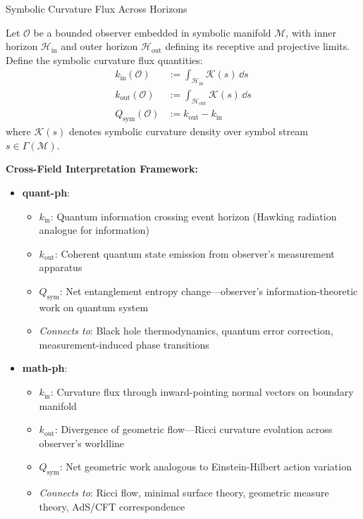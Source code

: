 \begin{scholium}{Symbolic Curvature Flux Across Horizons}
\label{scholium:bk1_curvature_flux_kin_kout}

Let $\mathcal{O}$ be a bounded observer embedded in symbolic manifold $\mathcal{M}$, with inner horizon $\mathcal{H}_{\text{in}}$ and outer horizon $\mathcal{H}_{\text{out}}$ defining its receptive and projective limits. Define the symbolic curvature flux quantities:
\begin{align}
k_{\text{in}}(\mathcal{O}) &:= \int_{\mathcal{H}_{\text{in}}} \mathcal{K}(s) \, \dd s \\
k_{\text{out}}(\mathcal{O}) &:= \int_{\mathcal{H}_{\text{out}}} \mathcal{K}(s) \, \dd s \\
Q_{\text{sym}}(\mathcal{O}) &:= k_{\text{out}} - k_{\text{in}}
\end{align}
where $\mathcal{K}(s)$ denotes symbolic curvature density over symbol stream $s \in \Gamma(\mathcal{M})$.

\textbf{Cross-Field Interpretation Framework:}

\begin{itemize}
\item \textbf{quant-ph}: 
  \begin{itemize}
  \item $k_{\text{in}}$: Quantum information crossing event horizon (Hawking radiation analogue for information)
  \item $k_{\text{out}}$: Coherent quantum state emission from observer's measurement apparatus
  \item $Q_{\text{sym}}$: Net entanglement entropy change—observer's information-theoretic work on quantum system
  \item \textit{Connects to}: Black hole thermodynamics, quantum error correction, measurement-induced phase transitions
  \end{itemize}

\item \textbf{math-ph}:
  \begin{itemize}
  \item $k_{\text{in}}$: Curvature flux through inward-pointing normal vectors on boundary manifold
  \item $k_{\text{out}}$: Divergence of geometric flow—Ricci curvature evolution across observer's worldline
  \item $Q_{\text{sym}}$: Net geometric work analogous to Einstein-Hilbert action variation
  \item \textit{Connects to}: Ricci flow, minimal surface theory, geometric measure theory, AdS/CFT correspondence
  \end{itemize}


\end{itemize}
\end{scholium}
